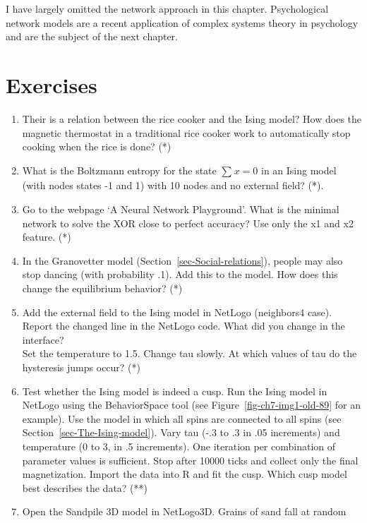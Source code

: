 \documentclass[
  a4paper,
  DIV=11,
  numbers=noendperiod,
  oneside]{scrreprt}
\begin{document}
I have largely omitted the network approach in this chapter.
Psychological network models are a recent application of complex systems
theory in psychology and are the subject of the next chapter.

\hypertarget{sec-Exercises}{%
\section{Exercises}\label{sec-Exercises}}

\begin{enumerate}
\def\labelenumi{\arabic{enumi})}
\item
  Their is a relation between the rice cooker and the Ising model? How
  does the magnetic thermostat in a traditional rice cooker work to
  automatically stop cooking when the rice is done? (*)
\item
  What is the Boltzmann entropy for the state \(\sum_{}^{}x = 0\) in an
  Ising model (with nodes states -1 and 1) with 10 nodes and no external
  field? (*).
\item
  Go to the webpage `A Neural Network Playground'. What is the minimal
  network to solve the XOR close to perfect accuracy? Use only the x1
  and x2 feature. (*)
\item
  In the Granovetter model (Section~\ref{sec-Social-relations}), people
  may also stop dancing (with probability .1). Add this to the model.
  How does this change the equilibrium behavior? (*)
\item
  Add the external field to the Ising model in NetLogo (neighbors4
  case). Report the changed line in the NetLogo code. What did you
  change in the interface?\\
  Set the temperature to 1.5. Change tau slowly. At which values of tau
  do the hysteresis jumps occur? (*)
\item
  Test whether the Ising model is indeed a cusp. Run the Ising model in
  NetLogo using the BehaviorSpace tool (see
  Figure~\ref{fig-ch7-img1-old-89} for an example). Use the model in
  which all spins are connected to all spins (see
  Section~\ref{sec-The-Ising-model}). Vary tau (-.3 to .3 in .05
  increments) and temperature (0 to 3, in .5 increments). One iteration
  per combination of parameter values is sufficient. Stop after 10000
  ticks and collect only the final magnetization. Import the data into R
  and fit the cusp. Which cusp model best describes the data? (**)
\item
  Open the Sandpile 3D model in NetLogo3D. Grains of sand fall at random

\end{enumerate}
\end{document}

